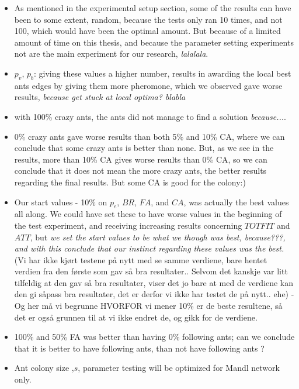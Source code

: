 \begin{itemize}
\item As mentioned in the experimental setup section, some of the results can have been to some extent, random, because the tests only ran 10 times, and not 100, which would have been the optimal amount. But because of a limited amount of time on this thesis, and because the parameter setting experiments not are the main experiment for our research, \emph{\color{red} lalalala}. 
\item $p_v$, $p_b$: giving these values a higher number, results in awarding the local best ants edges by giving them more pheromone, which we observed gave worse results, \emph{\color{red}because get stuck at local optima? blabla}
\item with 100\% crazy ants, the ants did not manage to find a solution \emph{\color{red}because...}. 
\item 0\% crazy ants gave worse results than both 5\% and 10\% CA, where we can conclude that some crazy ants is better than none. But, as we see in the results, more than 10\% CA gives worse results than 0\% CA, so we can conclude that it does not mean the more crazy ants, the better results regarding the final results. But some CA is good for the colony:)
\item Our start values - 10\% on $p_e$, $BR$, $FA$, and $CA$, was actually the best values all along. We could have set these to have worse values in the beginning of the test experiment, and receiving increasing results concerning $TOTFIT$ and $ATT$, but \emph{\color{red} we set the start values to be what we though was best, because???, and with this conclude that our instinct regarding these values was the best.} (Vi har ikke kjørt testene på nytt med se samme verdiene, bare hentet verdien fra den første som gav så bra resultater.. Selvom det kanskje var litt tilfeldig at den gav så bra resultater, viser det jo bare at med de verdiene kan den gi såpass bra resultater, det er derfor vi ikke har testet de på nytt.. ehe) - Og her må vi begrunne HVORFOR vi mener 10\% er de beste resultene, så det er også grunnen til at vi ikke endret de, og gikk for de verdiene.
\item 100\% and 50\% FA was better than having 0\% following ants; can we conclude that it is better to have following ants, than not have following ants ?
\item Ant colony size ,$s$, parameter testing will be optimized for Mandl network only.
\end{itemize}

